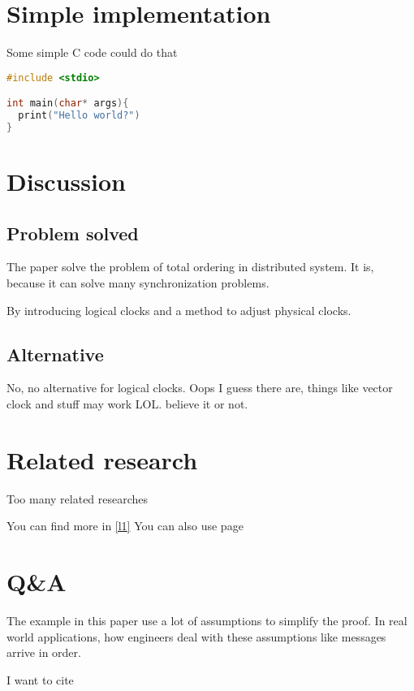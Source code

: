 \documentclass[12pt,a4paper,oneside]{article}
\begin{document}
\section{Simple implementation}

Some simple C code could do that

\begin{lstlisting}[language=C]
#include <stdio>

int main(char* args){
  print("Hello world?")
}
\end{lstlisting}

\section{Discussion}

\subsection{Problem solved}

The paper solve the problem of total ordering in distributed system.
It is, because it can solve many synchronization problems.

By introducing logical clocks and a method to adjust physical clocks.

\subsection{Alternative}

No, no alternative for logical clocks. Oops I guess there are, things
like vector clock and stuff may work LOL. believe it or not.

\section{Related research}


Too many related researches

You can find more in \ref{l1}
You can also use page \pageref{l1}

\section{Q\&A}

The example in this paper use a lot of assumptions to simplify the proof.
In real world applications, how engineers deal with these assumptions like messages
arrive in order.

I want to cite\cite{lamport1978time}
\end{document}

